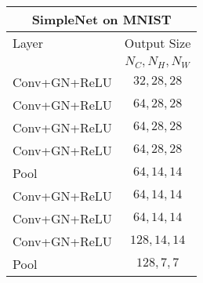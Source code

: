 \footnotesize
\begin{tabular}{|l|c|}
    \hline
    \multicolumn{2}{|c|}{\textbf{SimpleNet} on \textbf{MNIST}}\\
    \hline
    Layer & Output Size\\
    & $N_C, N_H, N_W$\\
    \hline
    \hline
    Conv+GN+ReLU & $32, 28, 28$\\
    Conv+GN+ReLU & $64, 28, 28$\\
    Conv+GN+ReLU & $64, 28, 28$\\
    Conv+GN+ReLU & $64, 28, 28$\\
    Pool & $64, 14, 14$\\
    Conv+GN+ReLU & $64, 14, 14$\\
    Conv+GN+ReLU & $64, 14, 14$\\
    Conv+GN+ReLU & $128, 14, 14$\\
    Pool & $128, 7, 7$\\

\end{tabular}
